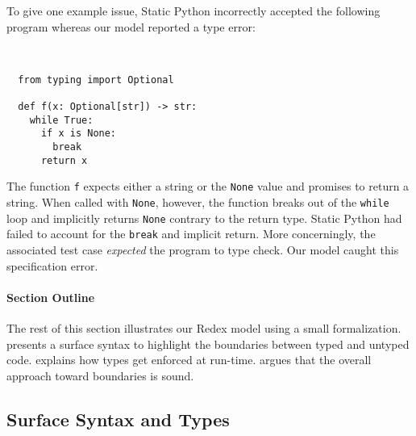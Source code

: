 \documentclass[english,cleveref,submission]{programming}
\newcommand{\SP}{Static Python}
\newcommand{\code}[1]{\texttt{#1}}
\begin{document}

To give one example issue, \SP{} incorrectly accepted the following program whereas our model
reported a type error:

\medskip
\begin{minipage}[t]{0.25\columnwidth}~
\end{minipage}\begin{minipage}[t]{0.4\columnwidth}
\begin{lstlisting}
  from typing import Optional

  def f(x: Optional[str]) -> str:
    while True:
      if x is None:
        break
      return x
\end{lstlisting}
%
\end{minipage}

\noindent{}The function \code{f} expects either a string or the \code{None} value and promises to return a string.
When called with \code{None}, however, the function breaks out of the \code{while} loop
and implicitly returns \code{None} contrary to the return type.
\SP{} had failed to account for the \code{break} and implicit return.
More concerningly, the associated test case \emph{expected} the program to type check.
Our model caught this specification error.


\paragraph{Section Outline}

The rest of this section illustrates our Redex model using
a small formalization.
 presents a surface syntax to highlight the boundaries between
typed and untyped code.
 explains how types get enforced at run-time.
 argues that the overall approach toward boundaries is sound.


\subsection{Surface Syntax and Types}
\label{s:surface}
\end{document}

